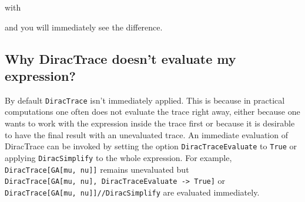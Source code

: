 \documentclass[../FeynCalcManual.tex]{subfiles}
\begin{document}
with

\begin{Shaded}
\begin{Highlighting}[]
\ExtensionTok{=}\NormalTok{;}
\ExtensionTok{=}\OperatorTok{[}\OperatorTok{,}  \OtherTok{{-}\textgreater{}} \OperatorTok{]}\NormalTok{;}
\ExtensionTok{=}\OperatorTok{[}\OperatorTok{,} \OperatorTok{\{}\OperatorTok{[}\OperatorTok{,} \OperatorTok{\{}\OperatorTok{\}],} \SpecialCharTok{{-}}\OperatorTok{[}\OperatorTok{,} \OperatorTok{\{}\OperatorTok{\}]\}} \OtherTok{{-}\textgreater{}} \OperatorTok{\{}\OperatorTok{[}\OperatorTok{,} \OperatorTok{\{}\OperatorTok{\}],} \SpecialCharTok{{-}}\OperatorTok{[}\OperatorTok{,} \OperatorTok{\{}\OperatorTok{\}]\},} 
\OtherTok{{-}\textgreater{}} \OperatorTok{\{}\OperatorTok{\},}\OtherTok{{-}\textgreater{}} \OperatorTok{,}\OtherTok{{-}\textgreater{}} \OperatorTok{\{}\OperatorTok{[}\OperatorTok{],} \OperatorTok{[}\OperatorTok{],} \OperatorTok{[}\OperatorTok{]\}]}\NormalTok{;}
\OperatorTok{[}\OperatorTok{,}\OtherTok{{-}\textgreater{}} \OperatorTok{\{}\OperatorTok{,} \OperatorTok{\},}\OtherTok{{-}\textgreater{}} \OperatorTok{,}\OtherTok{{-}\textgreater{}} \OperatorTok{]}\NormalTok{;}
\end{Highlighting}
\end{Shaded}

and you will immediately see the difference.

\hypertarget{why-diractrace-doesnt-evaluate-my-expression}{%
\subsection{Why DiracTrace doesn't evaluate my
expression?}\label{why-diractrace-doesnt-evaluate-my-expression}}

By default \texttt{DiracTrace} isn't immediately applied. This is
because in practical computations one often does not evaluate the trace
right away, either because one wants to work with the expression inside
the trace first or because it is desirable to have the final result with
an unevaluated trace. An immediate evaluation of DiracTrace can be
invoked by setting the option \texttt{DiracTraceEvaluate} to
\texttt{True} or applying \texttt{DiracSimplify} to the whole
expression. For example,
\texttt{DiracTrace[\allowbreak{}GA[\allowbreak{}mu,\ \allowbreak{}nu]]}
remains unevaluated but
\texttt{DiracTrace[\allowbreak{}GA[\allowbreak{}mu,\ \allowbreak{}nu],\ \allowbreak{}DiracTraceEvaluate -> True]}
or
\texttt{DiracTrace[\allowbreak{}GA[\allowbreak{}mu,\ \allowbreak{}nu]]//DiracSimplify}
are evaluated immediately.
\end{document}
